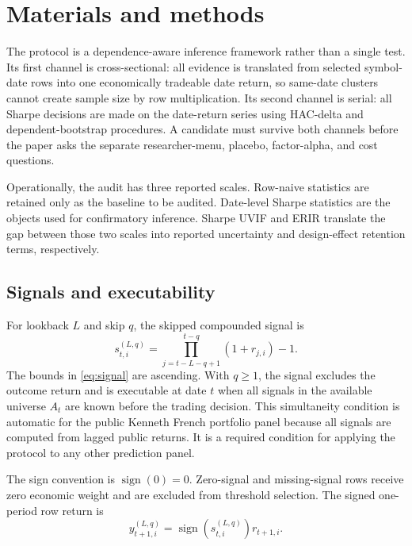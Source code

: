 \documentclass[12pt,a4paper]{article}
\DeclareMathOperator{\sign}{sign}
\begin{document}
\section{Materials and methods}
\label{sec:method}

The protocol is a dependence-aware inference framework rather than a
single test.  Its first channel is cross-sectional: all evidence is
translated from selected symbol-date rows into one economically
tradeable date return, so same-date clusters cannot create sample size by
row multiplication.  Its second channel is serial: all
Sharpe decisions are made on the date-return series using HAC-delta and
dependent-bootstrap procedures.  A candidate must survive both channels
before the paper asks the separate researcher-menu, placebo, factor-alpha,
and cost questions.

Operationally, the audit has three reported scales.  Row-naive statistics
are retained only as the baseline to be audited.  Date-level Sharpe
statistics are the objects used for confirmatory inference.  Sharpe UVIF
and ERIR translate the gap between those two scales into reported
uncertainty and design-effect retention terms, respectively.

\subsection{Signals and executability}

For lookback \(L\) and skip \(q\), the skipped compounded signal is
\begin{equation}
  s_{t,i}^{(L,q)} =
  \prod_{j=t-L-q+1}^{t-q} (1+r_{j,i}) - 1 .
  \label{eq:signal}
\end{equation}
The bounds in \eqref{eq:signal} are ascending.  With \(q\ge1\), the
signal excludes the outcome return and is executable at date \(t\) when
all signals in the available universe \(A_t\) are known before the
trading decision.  This simultaneity condition is automatic for the
public Kenneth French portfolio panel because all signals are computed
from lagged public returns.  It is a required condition for applying the
protocol to any other prediction panel.

The sign convention is \(\sign(0)=0\).  Zero-signal and missing-signal
rows receive zero economic weight and are excluded from threshold
selection.  The signed one-period row return is
\begin{equation}
  y_{t+1,i}^{(L,q)} = \sign(s_{t,i}^{(L,q)})r_{t+1,i}.
\end{equation}
\end{document}
